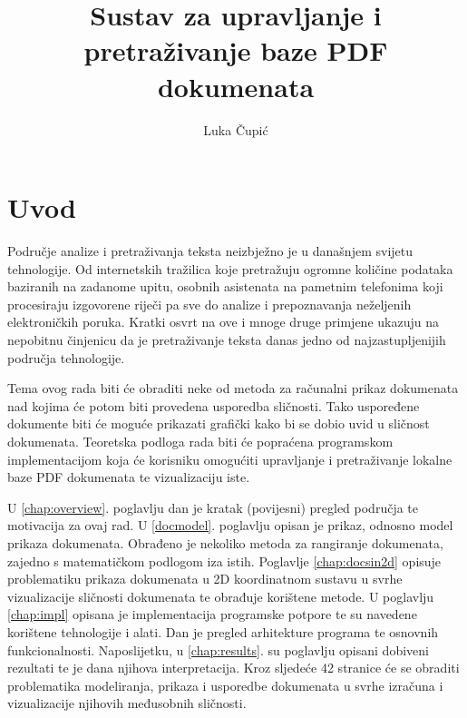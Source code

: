 \documentclass[times, utf8, zavrsni, numeric]{fer}
\begin{document}

\title{Sustav za upravljanje i pretraživanje baze PDF dokumenata}

\author{Luka Čupić}

\maketitle

\izvornik

\zahvala{}

\tableofcontents

\chapter{Uvod}
Područje analize i pretraživanja teksta neizbježno je u današnjem svijetu tehnologije. Od internetskih tražilica koje pretražuju ogromne količine podataka baziranih na zadanome upitu, osobnih asistenata na pametnim telefonima koji procesiraju izgovorene riječi pa sve do analize i prepoznavanja neželjenih elektroničkih poruka.
Kratki osvrt na ove i mnoge druge primjene ukazuju na nepobitnu činjenicu da je pretraživanje teksta danas jedno od najzastupljenijih područja tehnologije.

Tema ovog rada biti će obraditi neke od metoda za računalni prikaz dokumenata nad kojima će potom biti provedena usporedba sličnosti. Tako uspoređene dokumente biti će moguće prikazati grafički kako bi se dobio uvid u sličnost dokumenata. Teoretska podloga rada biti će popraćena programskom implementacijom koja će korisniku omogućiti upravljanje i pretraživanje lokalne baze PDF dokumenata te vizualizaciju iste.

U \ref{chap:overview}. poglavlju dan je kratak (povijesni) pregled područja te motivacija za ovaj rad. U \ref{docmodel}. poglavlju opisan je prikaz, odnosno model prikaza dokumenata. Obrađeno je nekoliko metoda za rangiranje dokumenata, zajedno s matematičkom podlogom iza istih. Poglavlje \ref{chap:docsin2d} opisuje problematiku prikaza dokumenata u 2D koordinatnom sustavu u svrhe vizualizacije sličnosti dokumenata te obrađuje korištene metode. U poglavlju \ref{chap:impl} opisana je implementacija programske potpore te su navedene korištene tehnologije i alati. Dan je pregled arhitekture programa te osnovnih funkcionalnosti. Naposlijetku, u \ref{chap:results}. su poglavlju opisani dobiveni rezultati te je dana njihova interpretacija. Kroz sljedeće 42 stranice \cite{adams1978hitchhikers} će se obraditi problematika modeliranja, prikaza i usporedbe dokumenata u svrhe izračuna i vizualizacije njihovih međusobnih sličnosti.
\end{document}
